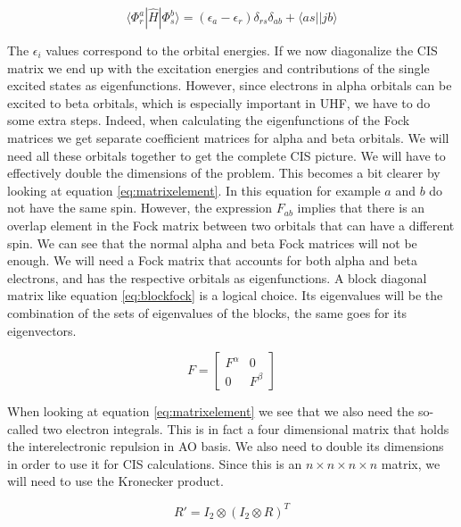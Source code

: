 \documentclass[twoside,twocolumn,9pt]{article}
\begin{document}
\begin{equation}\label{eq:simple}
  \langle \Phi_r^a|\hat{H}|\Phi_s^b \rangle = (\epsilon_a - \epsilon_r)\delta_{rs}\delta_{ab} + \langle as || jb \rangle
\end{equation}

The $\epsilon_i$ values correspond to the orbital energies. If we now diagonalize the CIS matrix we end up with the excitation energies and contributions of the single excited states as
eigenfunctions. However, since electrons in alpha orbitals can be excited to beta orbitals, which is especially important in UHF, we have to do some extra steps. Indeed, when
calculating the eigenfunctions of the Fock matrices we get separate coefficient matrices for alpha and beta orbitals. We will need all these orbitals together to get the complete
CIS picture. We will have to effectively double the dimensions of the problem. This becomes a bit clearer by looking at equation \eqref{eq:matrixelement}. In this equation for example
$a$ and $b$ do not have the same spin. However, the expression $F_{ab}$ implies that there is an overlap element in the Fock matrix between two orbitals that can have a different spin.
We can see that the normal alpha and beta Fock matrices will not be enough. We will need a Fock matrix that accounts for both alpha and beta electrons, and has the respective orbitals
as eigenfunctions. A block diagonal matrix like equation \eqref{eq:blockfock} is a logical choice. Its eigenvalues will be the combination of the sets of eigenvalues of the blocks,
the same goes for its eigenvectors.

\begin{equation}\label{eq:blockfock}
  F = \begin{bmatrix}
    F^\alpha & 0       \\
    0        & F^\beta
  \end{bmatrix}
\end{equation}

When looking at equation \eqref{eq:matrixelement} we see that we also need the so-called two electron integrals. This is in fact a four dimensional matrix that holds the
interelectronic repulsion in AO basis. We also need to double its dimensions in order to use it for CIS calculations. Since this is an $n\times n\times n \times n$
matrix, we will need to use the Kronecker product.

\begin{equation}\label{eq:kron}
  R' = I_2 \otimes (I_2 \otimes R)^T
\end{equation}
\end{document}
